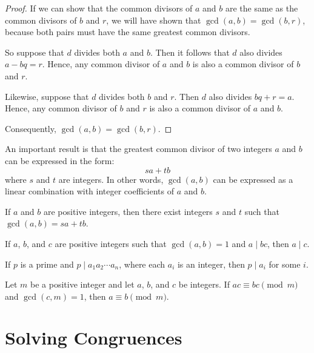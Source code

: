 \documentclass[../discrete.tex]{subfiles}
\begin{document}
\begin{proof}
    If we can show that the common divisors of $a$ and $b$ are the same as the common divisors of 
    $b$ and $r$, we will have shown that $\gcd(a,b)=\gcd(b,r)$, because both pairs must have the same 
    greatest common divisors.

    So suppose that $d$ divides both $a$ and $b$. Then it follows that $d$ also divides $a-bq=r$.
    Hence, any common divisor of $a$ and $b$ is also a common divisor of $b$ and $r$.

    Likewise, suppose that $d$ divides both $b$ and $r$. Then $d$ also divides $bq+r=a$.
    Hence, any common divisor of $b$ and $r$ is also a common divisor of $a$ and $b$.

    Consequently, $\gcd(a,b)=\gcd(b,r)$.
\end{proof}

An important result is that the greatest common divisor of two integers $a$ and $b$ can be expressed in the form:
\[sa+tb\]
where $s$ and $t$ are integers. In other words, $\gcd(a,b)$ can be expressed as a linear combination with integer coefficients of $a$ and $b$.

\begin{theorem}
    If $a$ and $b$ are positive integers, then there exist integers $s$ and $t$ such that $\gcd(a,b)=sa+tb$.
\end{theorem}

\begin{lemma}
    If $a$, $b$, and $c$ are positive integers such that $\gcd(a,b)=1$ and $a\mid bc$, then $a\mid c$.
\end{lemma}

\begin{lemma}
    If $p$ is a prime and $p\mid a_1a_2\cdots a_n$, where each $a_i$ is an integer, then $p\mid a_i$ for some $i$.
\end{lemma}

\begin{theorem}
    Let $m$ be a positive integer and let $a$, $b$, and $c$ be integers. If $ac\equiv bc \pmod{m}$ and $\gcd(c,m)=1$, then $a\equiv b\pmod{m}$.
\end{theorem}


\section{Solving Congruences}
\end{document}

